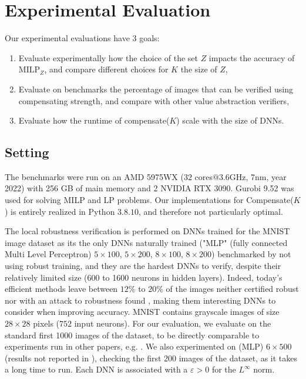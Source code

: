 \documentclass{llncs}
\newcommand{\MILP}{{\textrm{MILP}}}
\begin{document}
\section{Experimental Evaluation}

Our experimental evaluations have 3 goals:
\begin{enumerate}
  \item Evaluate experimentally how the choice of the set $Z$ impacts the accuracy of $\MILP_Z$, and compare different choices for $K$ the size of $Z$,
  \item Evaluate on benchmarks the percentage of images that can be verified
 using compensating strength, and compare with other value abstraction verifiers,
  \item Evaluate how the runtime of compensate($K$) scale with the size of DNNs.
\end{enumerate}

\subsection{Setting}
The benchmarks were run on an AMD 5975WX ($32$ cores$@3.6$GHz, 7nm, year 2022) with 256 GB of main memory and 2 NVIDIA RTX 3090. Gurobi 9.52 was used for solving MILP and LP problems. Our implementations for Compensate($K$) is entirely realized in Python 
$3.8.10$, and therefore not particularly optimal.

The local robustness verification is performed on DNNs trained for the MNIST image dataset as its the only DNNs naturally trained ("MLP" (fully connected Multi Level Perceptron) $5\times 100$, $5\times 200$, $8 \times 100$, $8 \times 200$) benchmarked by \cite{crown} not using robust training, and they are the hardest DNNs to verify, despite their relatively limited size (600 to 1600 neurons in hidden layers). Indeed, today's efficient methods leave between $12\%$ to $20\%$ of the images neither certified robust \cite{crown} nor with an attack to robustness found \cite{attack}, making them interesting DNNs to consider when improving accuracy. MNIST contains grayscale images of size $28 \times 28$ pixels ($752$ input neurons). For our evaluation, we evaluate on the standard first 1000 images of the dataset, to be directly comparable to experiments run in other papers, e.g. \cite{prima,crown}. We also experimented on (MLP) $6\times 500$ (results not reported in \cite{prima,crown}), checking the first 200 images of the dataset, as it takes a long time to run. Each DNN is associated with a $\varepsilon>0$ for the $L^\infty$ norm.
\end{document}
